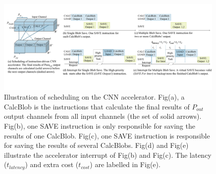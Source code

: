 







\begin{figure}[t]
 \centering
	\includegraphics[width=0.99\textwidth]{fig/singlesave.pdf} 	
	\vspace{-1mm} 
 \caption{
		Illustration of scheduling on the CNN accelerator. Fig(a), a CalcBlob is the instructions that calculate the final results of $P_{out}$ output channels from all input channels (the set of solid arrows). Fig(b), one SAVE instruction is only responsible for saving the results of one CalcBlob. Fig(c), one SAVE instruction is responsible for saving the results of several CalcBlobs. Fig(d) and Fig(e) illustrate the accelerator interrupt of Fig(b) and Fig(c). The latency ($t_{latency}$) and extra cost ($t_{cost}$) are labelled in Fig(e).
 }
	\label{fig:singlesave}
\end{figure}



